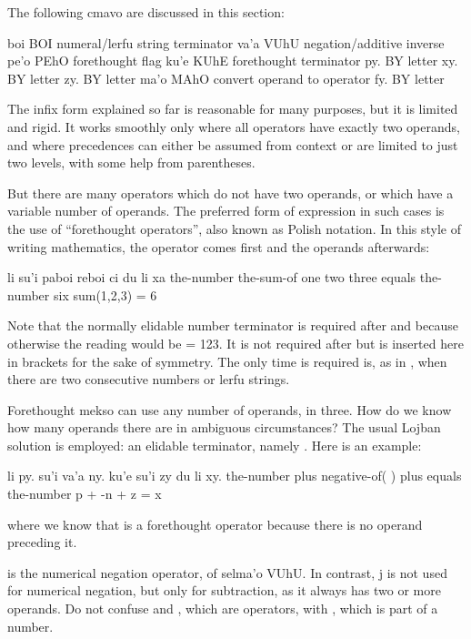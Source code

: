The following cmavo are discussed in this section:

   boi BOI numeral/lerfu string terminator
    va'a    VUhU    negation/additive inverse
    pe'o    PEhO    forethought flag
    ku'e    KUhE    forethought terminator
    py. BY  letter 
    xy. BY  letter 
    zy. BY  letter 
    ma'o    MAhO    convert operand to operator
    fy. BY  letter 

The infix form explained so far is reasonable for many
    purposes, but it is limited and rigid. It works smoothly only
    where all operators have exactly two operands, and where
    precedences can either be assumed from context or are limited
    to just two levels, with some help from parentheses. 

But there are many operators which do not have two operands,
    or which have a variable number of operands. The preferred form
    of expression in such cases is the use of ``forethought
    operators'', also known as Polish notation. In this style of
    writing mathematics, the operator comes first and the operands
    afterwards:
\begin{example}
li su'i paboi reboi ci du li xa\n
the-number the-sum-of one two three equals the-number six\n
sum(1,2,3) = 6
\end{example}

Note that the normally elidable number terminator  is
    required after  and  because otherwise the reading
    would be  = 123. It is not required after  but
    is inserted here in brackets for the sake of symmetry. The only
    time  is required is, as in , when there are two consecutive numbers or lerfu
    strings. 

Forethought mekso can use any number of operands, in  three. How do we know how many
    operands there are in ambiguous circumstances? The usual Lojban
    solution is employed: an elidable terminator, namely .
    Here is an example:
\begin{example}
li py. su'i va'a ny. ku'e su'i zy du li xy.\n
the-number  plus negative-of(  ) plus \n
\T	equals the-number \n
p + -n + z = x
\end{example}

{\noindent}where we know that  is a forethought operator because
    there is no operand preceding it. 

 is the numerical negation operator, of selma'o
    VUhU. In contrast, j  is not used for numerical
    negation, but only for subtraction, as it always has two or
    more operands. Do not confuse  and , which are
    operators, with , which is part of a number.

